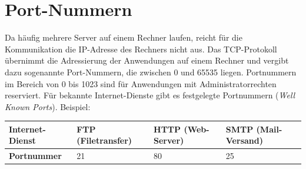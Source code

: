 \section{Port-Nummern}

Da häufig mehrere Server auf einem Rechner laufen, reicht für die Kommunikation
die IP-Adresse des Rechners nicht aus. Das TCP-Protokoll übernimmt die
Adressierung der Anwendungen auf einem Rechner und vergibt dazu sogenannte
Port-Nummern, die zwischen 0 und 65535 liegen. Portnummern im Bereich von 0 bis
1023 sind für Anwendungen mit Administratorrechten reserviert. Für bekannte
Internet-Dienste gibt es festgelegte Portnummern (\emph{Well Known Ports}).
Beispiel:

\begin{center}
\begin{minipage}{0.95\textwidth}
\bgroup
\def\arraystretch{1.2}
\begin{tabularx}{\textwidth}{|X|X|X|X|}
\hline
\textbf{Internet-Dienst} &
FTP (Filetransfer) & HTTP (Web-Server) & SMTP (Mail-Versand)
\\ \hline
\textbf{Portnummer} &
21 & 80 & 25
\\ \hline
\end{tabularx}
\egroup
\end{minipage}
\end{center}